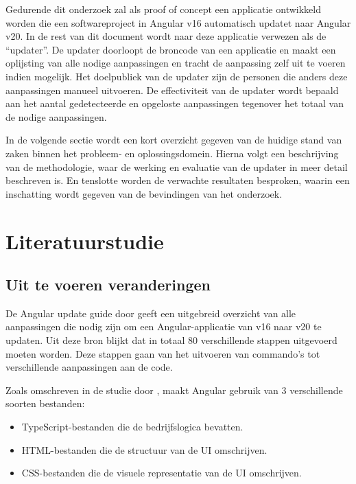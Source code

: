 Gedurende dit onderzoek zal als proof of concept een applicatie ontwikkeld worden die een softwareproject in Angular v16 automatisch updatet naar Angular v20.
In de rest van dit document wordt naar deze applicatie verwezen als de ``updater''.
De updater doorloopt de broncode van een applicatie en maakt een oplijsting van alle nodige aanpassingen en tracht de aanpassing zelf uit te voeren indien mogelijk.
Het doelpubliek van de updater zijn de personen die anders deze aanpassingen manueel uitvoeren.
De effectiviteit van de updater wordt bepaald aan het aantal gedetecteerde en opgeloste aanpassingen tegenover het totaal van de nodige aanpassingen.

In de volgende sectie wordt een kort overzicht gegeven van de huidige stand van zaken binnen het probleem- en oplossingsdomein.
Hierna volgt een beschrijving van de methodologie, waar de werking en evaluatie van de updater in meer detail beschreven is.
En tenslotte worden de verwachte resultaten besproken, waarin een inschatting wordt gegeven van de bevindingen van het onderzoek.

\section{Literatuurstudie}
\label{sec:literatuurstudie}

\subsection{Uit te voeren veranderingen}

De Angular update guide door \textcite{AngularUpdateGuide2025} geeft een uitgebreid overzicht van alle aanpassingen die nodig zijn om een Angular-applicatie van v16 naar v20 te updaten. 
Uit deze bron blijkt dat in totaal 80 verschillende stappen uitgevoerd moeten worden.
Deze stappen gaan van het uitvoeren van commando's tot verschillende aanpassingen aan de code.

Zoals omschreven in de studie door \textcite{Cincovic2020}, maakt Angular gebruik van 3 verschillende soorten bestanden:
\begin{itemize}
  \item TypeScript-bestanden die de bedrijfslogica bevatten.
  \item HTML-bestanden die de structuur van de UI omschrijven.
  \item CSS-bestanden die de visuele representatie van de UI omschrijven.
\end{itemize}

